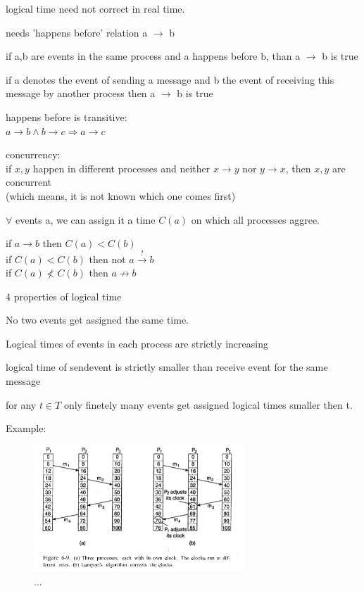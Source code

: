 \documentclass[ngerman,a4paper]{report}
\begin{document}
\begin{compactitem}
\item logical time need not correct in real time.
\item needs 'happens before' relation a $\rightarrow$ b

\begin{compactenum}
\item if a,b are events in the same process and a happens before b, than a $\rightarrow$ b is true
\item if a denotes the event of sending a message and b the event of receiving this message by another process then a $\rightarrow$ b is true
\end{compactenum}

\item happens before is transitive:\\
$a \rightarrow b \land b \rightarrow c \Rightarrow a \rightarrow c$
\item concurrency:\\
if $x, y$ happen in different processes and neither $x \rightarrow y$ nor $y \rightarrow x$, then $x, y$ are concurrent\\
(which means, it is not known which one comes first)
\item $\forall$ events a, we can assign it a time $C(a)$ on which all processes aggree.
\item if $a \rightarrow b$ then $C(a) < C(b)$ \\
    if $C(a) < C(b)$ then not $a \xrightarrow{?} b$\\
    if $C(a) \not < C(b)$ then $ a \not \rightarrow b$\\

\item 4 properties of logical time
\begin{compactenum}
\item No two events get assigned the same time.
\item Logical times of events in each process are strictly increasing
\item logical time of sendevent is strictly smaller than receive event for the same message
\item for any $t \in T$ only finetely many events get assigned logical times smaller then  t.
\end{compactenum}
\item Example:

\begin{figure}[h]
	\centering
	\includegraphics[width=300px]{gfx/lamport.png}
	\caption{...}
	\label{img:lamport}
\end{figure}

\end{compactitem}
\end{document}
